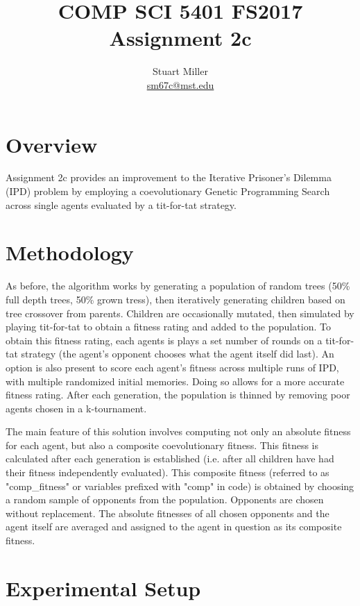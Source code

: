 \documentclass[11pt]{article}
\begin{document}
\title{COMP SCI 5401 FS2017 Assignment 2c}
\author{Stuart Miller\\\href{mailto:sm67c@mst.edu}{sm67c@mst.edu}}
\maketitle


\section{Overview}\label{sect:overview}

Assignment 2c provides an improvement to the Iterative Prisoner's Dilemma (IPD) problem by employing a coevolutionary Genetic Programming Search across single agents evaluated by a tit-for-tat strategy. 


\section{Methodology}\label{sect:methodology}
As before, the algorithm works by generating a population of random trees (50\% full depth trees, 50\% grown tress), then iteratively generating children based on tree crossover from parents. Children are occasionally mutated, then simulated by playing tit-for-tat to obtain a fitness rating and added to the population. To obtain this fitness rating, each agents is plays a set number of rounds on a tit-for-tat strategy (the agent's opponent chooses what the agent itself did last). An option is also present to score each agent's fitness across multiple runs of IPD, with multiple randomized initial memories. Doing so allows for a more accurate fitness rating. After each generation, the population is thinned by removing poor agents chosen in a k-tournament. 

The main feature of this solution involves computing not only an absolute fitness for each agent, but also a composite coevolutionary fitness. This fitness is calculated after each generation is established (i.e. after all children have had their fitness independently evaluated). This composite fitness (referred to as "comp\_fitness" or variables prefixed with "comp" in code) is obtained by choosing a random sample of opponents from the population. Opponents are chosen without replacement. The absolute fitnesses of all chosen opponents and the agent itself are averaged and assigned to the agent in question as its composite fitness.

\section{Experimental Setup}\label{sect:exp_setup}
\end{document}
